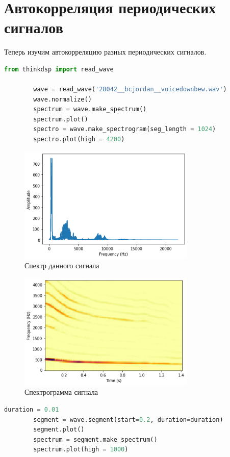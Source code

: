 \documentclass[a4paper, 12pt]{report}
\begin{document}
	\chapter{Автокорреляция периодических сигналов}
	Теперь изучим автокорреляцию разных периодических сигналов.
	\begin{lstlisting}[language=Python,caption=Запись вокального исполнения чирпов]
		from thinkdsp import read_wave

		wave = read_wave('28042__bcjordan__voicedownbew.wav')
		wave.normalize()
		spectrum = wave.make_spectrum()
		spectrum.plot()
		spectro = wave.make_spectrogram(seg_length = 1024)
		spectro.plot(high = 4200)
	\end{lstlisting}
	\begin{figure}[H]
		\centering
		\includegraphics[width=0.75\textwidth]{acr1.png}
		\caption{Спектр данного сигнала}
		\label{fig:arc1}
	\end{figure}
	\begin{figure}[H]
		\centering
		\includegraphics[width=0.75\textwidth]{acr2.png}
		\caption{Спектрограмма сигнала}
		\label{fig:arc2}
	\end{figure}
	\begin{lstlisting}[language=Python,caption=Уменьшение ширины сегмента]
		duration = 0.01
		segment = wave.segment(start=0.2, duration=duration)
		segment.plot()
		spectrum = segment.make_spectrum()
		spectrum.plot(high = 1000)
	\end{lstlisting}
\end{document}
